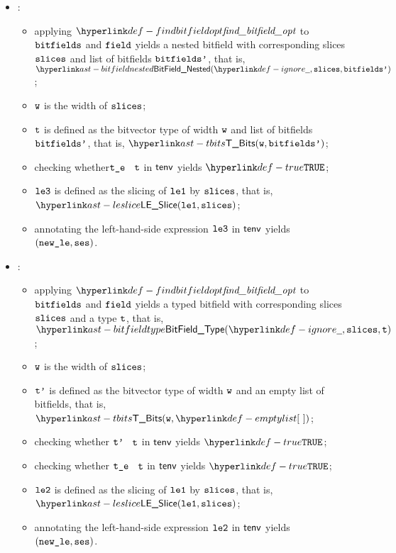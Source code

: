 \begin{itemize}
\begin{itemize}
    \item {}:
    \begin{itemize}
      \item applying $\findbitfieldopt$ to $\texttt{bitfields}$ and $\texttt{field}$ yields a nested bitfield with corresponding
            slices $\texttt{slices}$ and list of bitfields $\texttt{bitfields'}$, that is, \\ $\BitFieldNested(\Ignore, \slices, \bitfieldsp)$;
      \item $\texttt{w}$ is the width of $\texttt{slices}$;
      \item $\texttt{t}$ is defined as the bitvector type of width $\texttt{w}$ and list of bitfields $\texttt{bitfields'}$, that is, $\TBits(\vw, \bitfieldsp)$;
      \item checking whether$\texttt{t\_e}$ \typesatisfies\ $\texttt{t}$ in $\textsf{tenv}$ yields $\True$\ProseOrTypeError;
      \item $\texttt{le3}$ is defined as the slicing of $\texttt{le1}$ by $\texttt{slices}$, that is, \\ $\LESlice(\vleone, \slices)$;
      \item annotating the left-hand-side expression $\texttt{le3}$ in $\textsf{tenv}$ yields \\ $(\texttt{new\_le}, \texttt{ses})$\ProseOrTypeError.
    \end{itemize}

    \item {}:
    \begin{itemize}
      \item applying $\findbitfieldopt$ to $\texttt{bitfields}$ and $\texttt{field}$ yields a typed bitfield with corresponding
            slices $\texttt{slices}$ and a type $\texttt{t}$, that is, \\ $\BitFieldType(\Ignore, \vslices, \vt)$;
      \item $\texttt{w}$ is the width of $\texttt{slices}$;
      \item $\texttt{t'}$ is defined as the bitvector type of width $\texttt{w}$ and an empty list of bitfields, that is, $\TBits(\vw , \emptylist)$;
      \item checking whether $\texttt{t'}$ \typesatisfies\ $\texttt{t}$ in $\textsf{tenv}$ yields $\True$\ProseOrTypeError;
      \item checking whether $\texttt{t\_e}$ \typesatisfies\ $\texttt{t}$ in $\textsf{tenv}$ yields $\True$\ProseOrTypeError;
      \item $\texttt{le2}$ is defined as the slicing of $\texttt{le1}$ by $\texttt{slices}$, that is, \\ $\LESlice(\vleone, \slices)$;
      \item annotating the left-hand-side expression $\texttt{le2}$ in $\textsf{tenv}$ yields \\ $(\texttt{new\_le}, \texttt{ses})$\ProseOrTypeError.
    \end{itemize}
  \end{itemize}
\end{itemize}
